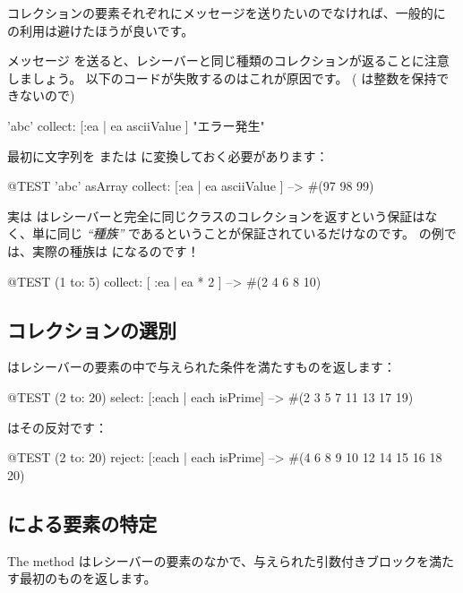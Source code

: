 \documentclass[a4paper,10pt,twoside]{book}
\begin{document}
コレクションの要素それぞれにメッセージを送りたいのでなければ、一般的に  の利用は避けたほうが良いです。

メッセージ  を送ると、レシーバーと同じ種類のコレクションが返ることに注意しましょう。
以下のコードが失敗するのはこれが原因です。
( は整数を保持できないので)
\begin{code}{}
'abc' collect: [:ea | ea asciiValue ]      "エラー発生"
\end{code}
\noindent
最初に文字列を  または  に変換しておく必要があります：
\begin{code}{@TEST}
'abc' asArray collect: [:ea | ea asciiValue ] --> #(97 98 99)
\end{code}

実は  はレシーバーと完全に同じクラスのコレクションを返すという保証はなく、単に同じ \emph{``種族''} であるということが保証されているだけなのです。 の例では、実際の種族は  になるのです！
\begin{code}{@TEST}
(1 to: 5) collect: [ :ea | ea * 2 ] --> #(2 4 6 8 10)
\end{code}

\subsection{コレクションの選別}

 はレシーバーの要素の中で与えられた条件を満たすものを返します：

\begin{code}{@TEST}
(2 to: 20) select: [:each | each isPrime] --> #(2 3 5 7 11 13 17 19)
\end{code}

 はその反対です：
\begin{code}{@TEST}
(2 to: 20) reject: [:each | each isPrime] --> #(4 6 8 9 10 12 14 15 16 18 20)
\end{code}

\subsection{ による要素の特定}
The method  はレシーバーの要素のなかで、与えられた引数付きブロックを満たす最初のものを返します。
\end{document}
